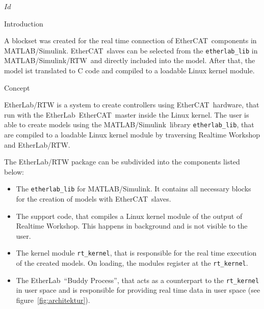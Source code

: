 %
%
\SVN $Id$
\rfoot{\SVNId}

\begin{ighsec}{Introduction}
\label{sec:einleitung}

A blockset was created for the real time connection of EtherCAT\regTM\ 
components in MATLAB/Simulink\regTM. EtherCAT\regTM\ slaves can be
selected from the \texttt{etherlab\_lib} in MATLAB/Simulink/RTW\regTM\ 
and directly included into the model. After that, the model ist
translated to C code and compiled to a loadable Linux kernel module.

\end{ighsec}


\begin{ighsec}{Concept}
\label{sec:konzept}

EtherLab\regTM/RTW is a system to create controllers using
EtherCAT\regTM\ hardware, that run with the EtherLab\regTM\ 
EtherCAT\regTM\ master inside the Linux kernel. The user is able to
create models using the MATLAB/Simulink\regTM\ library
\texttt{etherlab\_lib}, that are compiled to a loadable Linux kernel
module by traversing Realtime Workshop and EtherLab\regTM/RTW.

The EtherLab\regTM/RTW package can be subdivided into the components
listed below:

\begin{itemize}
\item The \texttt{etherlab\_lib} for MATLAB/Simulink\regTM. It
  contains all necessary blocks for the creation of models with
  EtherCAT\regTM\ slaves.
\item The support code, that compiles a Linux kernel module of the
  output of Realtime Workshop. This happens in background and is not
  visible to the user.
\item The kernel module \texttt{rt\_kernel}, that is responsible for
  the real time execution of the created models. On loading, the
  modules register at the \texttt{rt\_kernel}.
\item The EtherLab\regTM\ ``Buddy Process'', that acts as a
  counterpart to the \texttt{rt\_kernel} in user space and is
  responsible for providing real time data in user space (see
  figure~\ref{fig:architektur}).
\end{itemize}


\end{ighsec}
